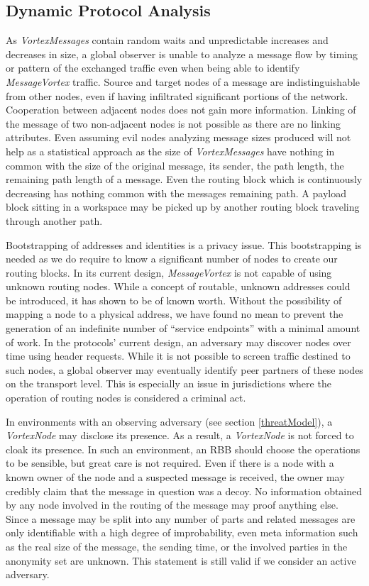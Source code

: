 \documentclass[acmsmall, screen, final]{acmart}
\begin{document}
	\subsection{Dynamic Protocol Analysis\label{sec:dynamicAnalysis}}
	As \emph{VortexMessages} contain random waits and unpredictable increases and decreases in size, a global observer is unable to analyze a message flow by timing or pattern of the exchanged traffic even when being able to identify \emph{MessageVortex} traffic. Source and target nodes of a message are indistinguishable from other nodes, even if having infiltrated significant portions of the network. Cooperation between adjacent nodes does not gain more information. Linking of the message of two non-adjacent nodes is not possible as there are no linking attributes. Even assuming evil nodes analyzing message sizes produced will not help as a statistical approach as the size of \emph{VortexMessages} have nothing in common with the size of the original message, its sender, the path length, the remaining path length of a message. Even the routing block which is continuously decreasing has nothing common with the messages remaining path. A payload block sitting in a workspace may be picked up by another routing block traveling through another path.
	
	Bootstrapping of addresses and identities is a privacy issue. This bootstrapping is needed as we do require to know a significant number of nodes to create our routing blocks. In its current design, \emph{MessageVortex} is not capable of using unknown routing nodes. While a concept of routable, unknown addresses could be introduced, it has shown to be of known worth. Without the possibility of mapping a node to a physical address, we have found no mean to prevent the generation of an indefinite number of ``service endpoints'' with a minimal amount of work. In the protocols' current design, an adversary may discover nodes over time using header requests. While it is not possible to screen traffic destined to such nodes, a global observer may eventually identify peer partners of these nodes on the transport level. This is especially an issue in jurisdictions where the operation of routing nodes is considered a criminal act. 
	
	In environments with an observing adversary (see section \ref{threatModel}), a \emph{VortexNode} may disclose its presence. As a result, a \emph{VortexNode} is not forced to cloak its presence. In such an environment, an RBB should choose the operations to be sensible, but great care is not required. Even if there is a node with a known owner of the node and a suspected message is received, the owner may credibly claim that the message in question was a decoy. No information obtained by any node involved in the routing of the message may proof anything else. Since a message may be split into any number of parts and related messages are only identifiable with a high degree of improbability, even meta information such as the real size of the message, the sending time, or the involved parties in the anonymity set are unknown. This statement is still valid if we consider an active adversary.
	
\end{document}
